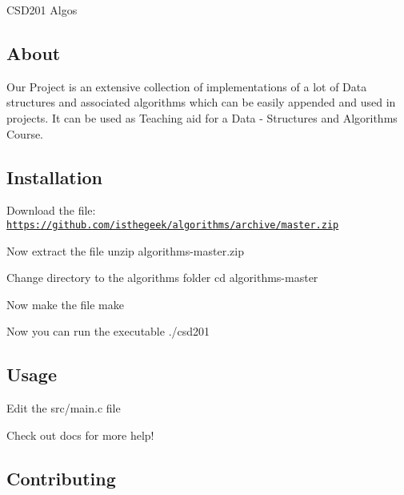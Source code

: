 C\-S\-D201 Algos

\subsection*{About}

Our Project is an extensive collection of implementations of a lot of Data structures and associated algorithms which can be easily appended and used in projects. It can be used as Teaching aid for a Data -\/ Structures and Algorithms Course.

\subsection*{Installation}


\begin{DoxyPre}
Download the file: \href{https://github.com/isthegeek/algorithms/archive/master.zip}{\tt https://github.com/isthegeek/algorithms/archive/master.zip}\end{DoxyPre}



\begin{DoxyPre}Now extract the file
{\ttfamily unzip algorithms-master.zip}\end{DoxyPre}



\begin{DoxyPre}Change directory to the algorithms folder
{\ttfamily cd algorithms-master}\end{DoxyPre}



\begin{DoxyPre}Now make the file
{\ttfamily make}\end{DoxyPre}



\begin{DoxyPre}Now you can run the executable
{\ttfamily ./csd201}
\end{DoxyPre}


\subsection*{Usage}

Edit the src/main.\-c file

Check out docs for more help!

\subsection*{Contributing}


